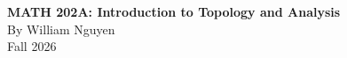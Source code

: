 \documentclass[10pt, oneside]{book}
\begin{document}
\frontmatter
\begin{titlepage}
    \centering
    \vspace*{8cm}

    {\Huge \textbf{MATH 202A: Introduction to Topology and Analysis}}\\[1cm]
    {\Large By William Nguyen}\\[0.5cm]
    {\large Fall 2026}\\
    \vfill
    
\end{titlepage}

\tableofcontents
\newpage
{}

\clearpage
\mainmatter
\pagestyle{plain}


\end{document}
